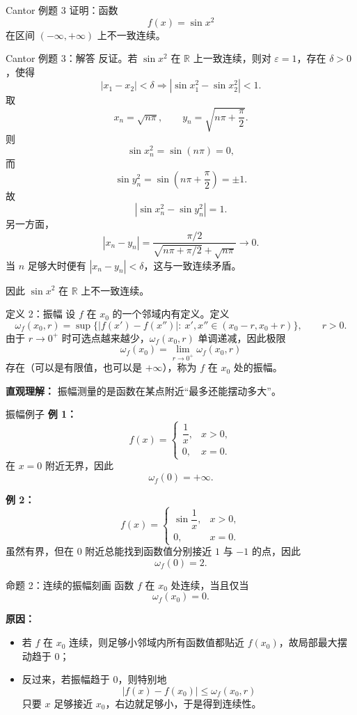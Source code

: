 ﻿\documentclass[aspectratio=169,11pt]{ctexbeamer}
\newcommand{\R}{\mathbb{R}}
\newcommand{\osc}{\omega}
\begin{document}
\begin{frame}{Cantor 例题 3}
证明：函数
\[
  f(x)=\sin x^2
\]
在区间 $(-\infty,+\infty)$ 上不一致连续。
\end{frame}

\begin{frame}[allowframebreaks]{Cantor 例题 3：解答}
反证。若 $\sin x^2$ 在 $\R$ 上一致连续，则对 $\varepsilon=1$，存在 $\delta>0$，使得
\[
  |x_1-x_2|<\delta
  \Longrightarrow
  |\sin x_1^2-\sin x_2^2|<1.
\]
取
\[
  x_n=\sqrt{n\pi},\qquad y_n=\sqrt{n\pi+\frac{\pi}{2}}.
\]
则
\[
  \sin x_n^2=\sin(n\pi)=0,
\]
而
\[
  \sin y_n^2=\sin\!\left(n\pi+\frac{\pi}{2}\right)=\pm 1.
\]
故
\[
  |\sin x_n^2-\sin y_n^2|=1.
\]
另一方面，
\[
  |x_n-y_n|
  =
  \frac{\pi/2}{\sqrt{n\pi+\pi/2}+\sqrt{n\pi}}
  \to 0.
\]
当 $n$ 足够大时便有 $|x_n-y_n|<\delta$，这与一致连续矛盾。
\vspace{0.5em}

因此 $\sin x^2$ 在 $\R$ 上不一致连续。
\end{frame}

\begin{frame}{定义 2：振幅}
设 $f$ 在 $x_0$ 的一个邻域内有定义。定义
\[
  \osc_f(x_0,r)
  =
  \sup\bigl\{|f(x')-f(x'')|:\ x',x''\in(x_0-r,x_0+r)\bigr\},
  \qquad r>0.
\]
由于 $r\to 0^+$ 时可选点越来越少，$\osc_f(x_0,r)$ 单调递减，因此极限
\[
  \osc_f(x_0)=\lim_{r\to 0^+}\osc_f(x_0,r)
\]
存在（可以是有限值，也可以是 $+\infty$），称为 $f$ 在 $x_0$ 处的振幅。
\vspace{0.5em}

\textbf{直观理解：} 振幅测量的是函数在某点附近“最多还能摆动多大”。
\end{frame}

\begin{frame}{振幅例子}
\textbf{例 1：}
\[
  f(x)=
  \begin{cases}
    \dfrac1x,& x>0,\\
    0,& x=0.
  \end{cases}
\]
在 $x=0$ 附近无界，因此
\[
  \osc_f(0)=+\infty.
\]
\vspace{0.5em}

\textbf{例 2：}
\[
  f(x)=
  \begin{cases}
    \sin\dfrac1x,& x>0,\\
    0,& x=0.
  \end{cases}
\]
虽然有界，但在 $0$ 附近总能找到函数值分别接近 $1$ 与 $-1$ 的点，因此
\[
  \osc_f(0)=2.
\]
\end{frame}

\begin{frame}{命题 2：连续的振幅刻画}
函数 $f$ 在 $x_0$ 处连续，当且仅当
\[
  \osc_f(x_0)=0.
\]
\vspace{0.5em}

\textbf{原因：}
\begin{itemize}
  \item 若 $f$ 在 $x_0$ 连续，则足够小邻域内所有函数值都贴近 $f(x_0)$，故局部最大摆动趋于 $0$；
  \item 反过来，若振幅趋于 $0$，则特别地
  \[
    |f(x)-f(x_0)|\le \osc_f(x_0,r)
  \]
  只要 $x$ 足够接近 $x_0$，右边就足够小，于是得到连续性。
\end{itemize}
\end{frame}
\end{document}
